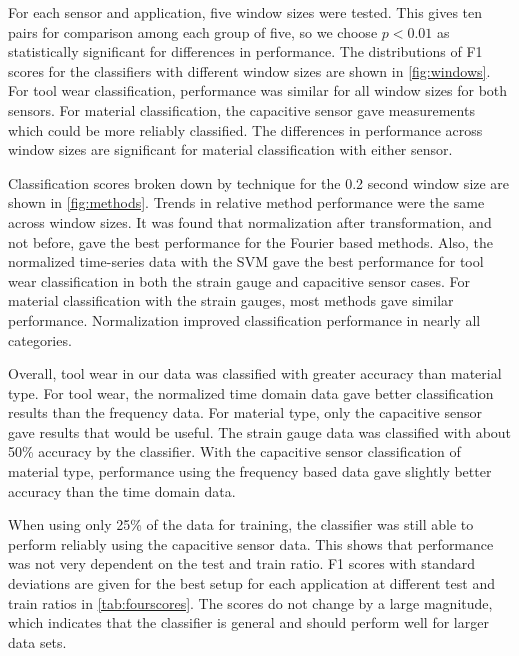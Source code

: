 For each sensor and application, five window sizes were tested. 
This gives ten pairs for comparison among each group of five, 
 so we choose $p<0.01$ as statistically significant for differences in performance.
The distributions of F1 scores for the classifiers with different window sizes are shown in \ref{fig:windows}.
For tool wear classification, performance was similar for all window sizes for both sensors.
For material classification, the capacitive sensor gave measurements which could be more reliably classified.
The differences in performance across window sizes are significant for material classification with either sensor.

Classification scores broken down by technique for the 0.2 second window size are shown in \ref{fig:methods}.
Trends in relative method performance were the same across window sizes.
It was found that normalization after transformation, and not before, gave the best performance for 
 the Fourier based methods.
Also, the normalized time-series data with the SVM gave the best performance for 
 tool wear classification in both the strain gauge and capacitive sensor cases.
For material classification with the strain gauges, most methods gave similar performance.
Normalization improved classification performance in nearly all categories.

Overall, tool wear in our data was classified with greater accuracy than material type. 
For tool wear, the normalized time domain data gave better classification results than
 the frequency data.
For material type, only the capacitive sensor gave results that would be useful. 
The strain gauge data was classified with about 50\% accuracy by the classifier.
With the capacitive sensor classification of material type, 
performance using the frequency based data gave slightly better accuracy than the time
domain data.

When using only 25\% of the data for training, the classifier was still able to perform
reliably using the capacitive sensor data. 
This shows that performance was not very dependent on the test and train ratio.
F1 scores with standard deviations are given for the best setup for each application 
 at different test and train ratios in \ref{tab:fourscores}.
The scores do not change by a large magnitude, which indicates that 
 the classifier is general and should perform well for larger data sets.

